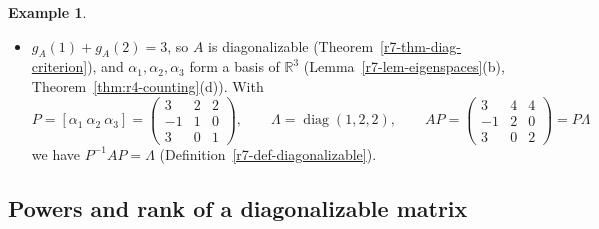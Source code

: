 \documentclass[12pt]{article}
\newcommand{\R}{\mathbb R}
\DeclareMathOperator{\diag}{diag}
\theoremstyle{definition}
\newtheorem{example}[theorem]{Example}
\begin{document}
\begin{example}
\begin{itemize}
\[\]
So \(g_A(2)=3-1=2\), and the special solutions \(\alpha_2=(2,1,0)'\), \(\alpha_3=(2,0,1)'\) form a basis of
\(\mathcal N(A-2I)\) (Theorem~\ref{thm:r4-four-bases}(c)).
\item \(g_A(1)+g_A(2)=3\), so \(A\) is diagonalizable (Theorem~\ref{r7-thm-diag-criterion}), and
\(\alpha_1,\alpha_2,\alpha_3\) form a basis of \(\R^3\) (Lemma~\ref{r7-lem-eigenspaces}(b),
Theorem~\ref{thm:r4-counting}(d)). With
\[
P=[\alpha_1\ \alpha_2\ \alpha_3]=\begin{pmatrix}3&2&2\\-1&1&0\\3&0&1\end{pmatrix},\qquad\Lambda=\diag(1,2,2),\qquad
AP=\begin{pmatrix}3&4&4\\-1&2&0\\3&0&2\end{pmatrix}=P\Lambda
\]
we have \(P^{-1}AP=\Lambda\) (Definition~\ref{r7-def-diagonalizable}).
\end{itemize}
\end{example}

\subsection*{Powers and rank of a diagonalizable matrix}
\end{document}
